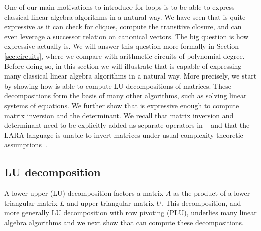 

One of our main motivations to introduce for-loops is to be able to express classical linear algebra algorithms in a natural way. We have seen that \langfor is
quite expressive as it can check for cliques, compute the transitive closure, and can even
leverage a successor relation on canonical vectors. The big question is how expressive \langfor
actually is. We will answer this question more formally in Section \ref{sec:circuits}, where we compare \langfor with 
arithmetic circuits of polynomial degree.
Before doing so, in this section we will illustrate that \langfor is capable of expressing many classical linear algebra algorithms in a natural way. More precisely, we start by showing how  \langfor is able to
compute LU decompositions of matrices. These decompositions form the basis of many other algorithms, such as solving linear systems of equations. We further show that \langfor is expressive enough to compute matrix inversion and the determinant. We recall that matrix inversion and determinant need to be explicitly added as separate operators in \lang~\cite{matlang-journal} and that the LARA language is unable to invert matrices under usual complexity-theoretic assumptions~\cite{BarceloH0S20}.


\subsection{LU decomposition}
A lower-upper (LU) decomposition factors a matrix $A$ as the product of a lower triangular matrix $L$ and upper triangular matrix $U$.  
This decomposition, and more generally LU decomposition with row pivoting (PLU),  underlies many linear algebra algorithms and 
we next show that \langfor can compute these decompositions.


